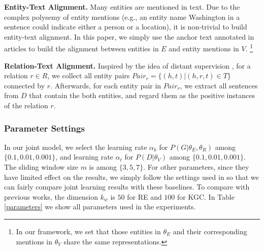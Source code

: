 \documentclass[letterpaper]{article} %
\begin{document}
\textbf{Entity-Text Alignment.} Many entities are mentioned in text. Due to the complex polysemy of entity mentions (e.g., an entity name Washington in a sentence could indicate either a person or a location), it is non-trivial to build entity-text alignment. In this paper, we simply use the anchor text annotated in articles to build the alignment between entities in $E$ and entity mentions in $V$. \footnote{In our framework, we set that those entities in $\theta_E$ and their corresponding mentions in $\theta_V$ share the same representations.}

\textbf{Relation-Text Alignment.} Inspired by the idea of distant supervision \cite{min2013distant}, for a relation $r \in R$, we collect all entity pairs $Pair_{r} = \{(h, t) | (h, r, t) \in T \}$ connected by $r$. Afterwards, for each entity pair in $Pair_{r}$, we extract all sentences from $D$ that contain the both entities, and regard them as the positive instances of the relation $r$. 

\subsubsection{Parameter Settings}

In our joint model, we select the learning rate $\alpha_k$ for $P(G|{\theta_E,\theta_R})$ among $\{0.1, 0.01, 0.001\}$, and learning rate $\alpha_t$ for $P(D|{\theta_V})$ among $\{0.1, 0.01, 0.001\}$. The sliding window size $m$ is among $\{3,5,7\}$. For other parameters, since they have limited effect on the results, we simply follow the settings used in \cite{zeng2014relation,lin2016neural} so that we can fairly compare joint learning results with these baselines. To compare with previous works, the dimension $k_w$ is $50$ for RE and $100$ for KGC. In Table \ref{parameters} we show all parameters used in the experiments.


\begin{table}[htb]
\centering
{}
\caption{Parameter settings}
\label{parameters}
\end{table}
\end{document}
